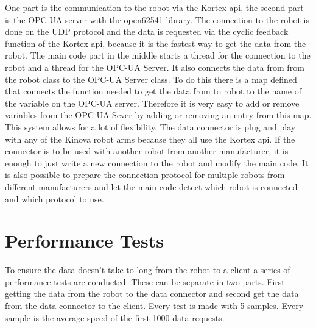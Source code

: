 \documentclass[conference]{IEEEtran}
\begin{document}
One part is the communication to the robot via the Kortex api, the second part is the OPC-UA server with the open62541 library.
The connection to the robot is done on the UDP protocol and the data is requested via the cyclic feedback function of the Kortex api, because it is the fastest way to get the data from the robot.
The main code part in the middle  starts a thread for the connection to the robot and a thread for the OPC-UA Server.
It also connects the data from from the robot class to the OPC-UA Server class.
To do this there is a map defined that connects the function needed to get the data from to robot to the name of the variable on the OPC-UA server.
Therefore it is very easy to add or remove variables from the OPC-UA Sever by adding or removing an entry from this map.\\
This system allows for a lot of flexibility. The data connector is plug and play with any of the Kinova robot arms because they all use the Kortex api.
If the connector is to be used with another robot from another manufacturer, it is enough to just write a new connection to the robot and modify the main code.
It is also possible to prepare the connection protocol for multiple robots from different manufacturers and let the main code detect which robot is connected and which protocol to use.

\section{Performance Tests}
To ensure the data doesn't take to long from the robot to a client a series of performance tests are conducted.
These can be separate in two parts. 
First getting the data from the robot to the data connector and second get the data from the data connector to the client.
Every test is made with 5 samples. Every sample is the average speed of the first 1000 data requests.
\end{document}

